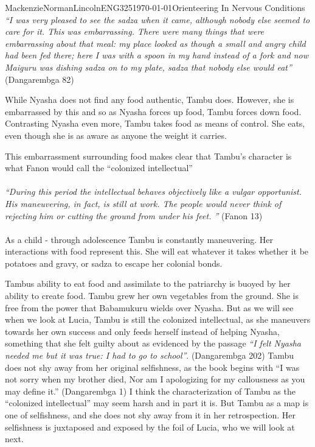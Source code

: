 \documentclass{article}
\begin{document}
\begin{mla}{Mackenzie}{Norman}{Lincoln}{ENG325}{\today}{Orienteering In Nervous Conditions}
\textit{``I was very pleased to see the sadza when it came, although nobody else seemed to care for it. This was embarrassing. There were many things that were embarrassing about that meal: my place looked as though a small and angry child had been fed there; here I was with a spoon in my hand instead of a fork and now Maiguru was dishing sadza on to my plate, sadza that nobody else would eat'' } (Dangarembga 82)


While Nyasha does not find any food authentic, Tambu does. However, she is embarrassed by this and so as Nyasha forces up food, Tambu forces down food. Contrasting Nyasha even more, Tambu takes food as means of control. She eats, even though she is as aware as anyone the weight it carries. 

This embarrassment surrounding food makes clear that Tambu's character is what Fanon would call the ``colonized intellectual'' 
\paragraph{}
\textit{``During this period the intellectual behaves objectively like a vulgar opportunist. His maneuvering, in fact, is still at work. The people would never think of rejecting him or cutting the ground from under his feet. ''} (Fanon 13)
\paragraph{}
As a child - through adolescence Tambu is constantly maneuvering. Her interactions with food represent this. She will eat whatever it takes whether it be potatoes and gravy, or sadza to escape her colonial bonds.

Tambus ability to eat food and assimilate to the patriarchy is buoyed by her ability to create food. Tambu grew her own vegetables from the ground. She is free from the power that Babamukuru wields over Nyasha. But as we will see when we look at Lucia, Tambu is still the colonized intellectual, as she maneuvers towards her own success and only feeds herself instead of helping Nyasha, something that she felt guilty about as evidenced by the passage \textit{``I felt Nyasha needed me but it was true: I had to go to school''}. (Dangarembga 202)  Tambu does not shy away from her original selfishness, as the book begins with  ``I was not sorry when my brother died, Nor am I apologizing for my callousness as you may define it.'' (Dangarembga 1) I think the characterization of Tambu as the ``colonized intellectual'' may seem harsh and in part it is. But Tambu as a map is one of selfishness, and she does not shy away from it in her retrospection. Her selfishness is juxtaposed and exposed by the foil of Lucia, who we will look at next.


\end{mla}
\end{document}
